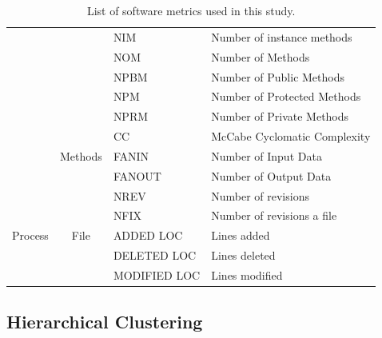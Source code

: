 \documentclass[10pt,journal,compsoc]{IEEEtran}
\begin{document}
\begin{table}[!t]
\begin{tabular}{|p{1cm}|c|l|p{3cm}|}
                                  &                                   & NIM         & Number of instance methods     \\ \cline{3-4} 
                                  &                                   & NOM         & Number of Methods              \\ \cline{3-4} 
                                  &                                   & NPBM        & Number of Public Methods       \\ \cline{3-4} 
                                  &                                   & NPM         & Number of Protected Methods    \\ \cline{3-4} 
                                  &                                   & NPRM        & Number of Private Methods      \\ \cline{2-4} 
                                  & \multirow{3}{*}{Methods}          & CC          & McCabe Cyclomatic Complexity   \\ \cline{3-4} 
                                  &                                   & FANIN       & Number of Input Data           \\ \cline{3-4} 
                                  &                                   & FANOUT      & Number of Output Data          \\ \hline
\multirow{5}{*}{Process }  & \multirow{5}{*}{File}             & NREV        & Number of revisions            \\ \cline{3-4} 
                                  &                                   & NFIX        & Number of revisions a file     \\ \cline{3-4} 
                                  &                                   & ADDED LOC    & Lines added                    \\ \cline{3-4} 
                                  &                                   & DELETED LOC  & Lines deleted                  \\ \cline{3-4} 
                                  &                                   & MODIFIED LOC & Lines modified                 \\ \hline
\end{tabular}
\caption{List of software metrics used in this study.}
\label{tbl:metric}
\end{table}
\subsection{Hierarchical Clustering}
\label{sec:hc}
\end{document}
